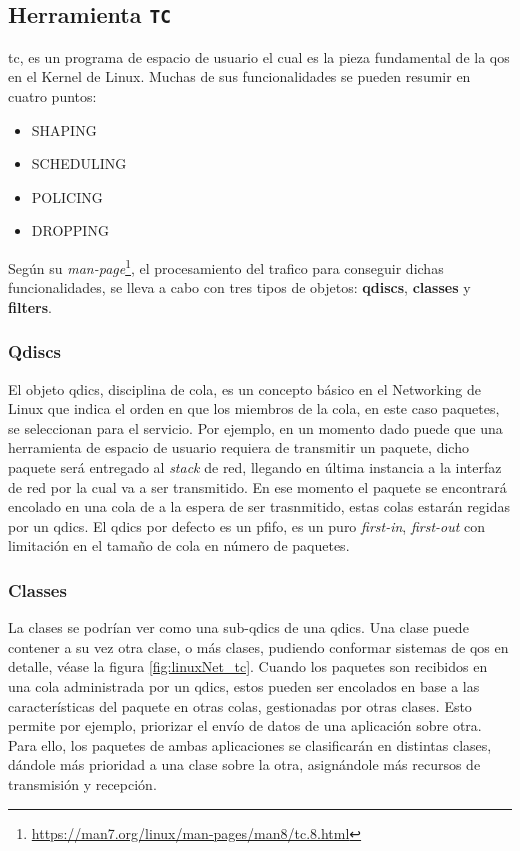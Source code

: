 
\subsection{Herramienta \texttt{TC}}


\gls{tc}, es un programa de espacio de usuario el cual es la pieza fundamental de la \gls{qos} en el Kernel de Linux. Muchas de sus funcionalidades se pueden resumir en cuatro puntos:

\begin{itemize}
    \item \textsc{SHAPING}
    \item \textsc{SCHEDULING}
    \item \textsc{POLICING}
    \item \textsc{DROPPING}
\end{itemize}

Según su \textit{man-page}\footnote{\url{https://man7.org/linux/man-pages/man8/tc.8.html}}, el procesamiento del trafico para conseguir dichas funcionalidades, se lleva a cabo con tres tipos de objetos: \textbf{qdiscs}, \textbf{classes} y \textbf{filters}.

\subsubsection{Qdiscs}

El objeto \gls{qdics}, disciplina de cola, es un concepto básico en el Networking de Linux que indica el orden en que los miembros de la cola, en este caso paquetes, se seleccionan para el servicio. Por ejemplo, en un momento dado puede que una herramienta de espacio de usuario requiera de transmitir un paquete, dicho paquete será entregado al \textit{stack} de red, llegando en última instancia a la interfaz de red por la cual va a ser transmitido. En ese momento el paquete se encontrará encolado en una cola de a la espera de ser trasnmitido, estas colas estarán regidas por un \gls{qdics}. El \gls{qdics} por defecto es un pfifo, es un puro \textit{first-in}, \textit{first-out} con limitación en el tamaño de cola en número de paquetes.


\subsubsection{Classes}

La clases se podrían ver como una sub-\gls{qdics} de una \gls{qdics}. Una clase puede contener a su vez otra clase, o más clases, pudiendo conformar sistemas de \gls{qos} en detalle, véase la figura \ref{fig:linuxNet_tc}. Cuando los paquetes son recibidos en una cola administrada por un \gls{qdics}, estos pueden ser encolados en base a las características del paquete en otras colas,  gestionadas por otras clases. Esto permite por ejemplo, priorizar el envío de datos de una aplicación sobre otra. Para ello, los paquetes de ambas aplicaciones se clasificarán en distintas clases, dándole más prioridad a una clase sobre la otra, asignándole más recursos de transmisión y recepción.

